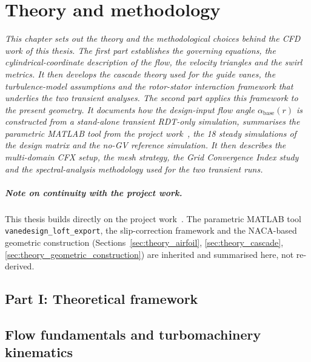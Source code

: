 \chapter{Theory and methodology}
\label{chap:theory_method}

\begin{center} %
\singlespacing\parbox{12cm}{\textit{
This chapter sets out the theory and the methodological choices behind the CFD work of this thesis. The first part establishes the governing equations, the cylindrical-coordinate description of the flow, the velocity triangles and the swirl metrics. It then develops the cascade theory used for the guide vanes, the turbulence-model assumptions and the rotor-stator interaction framework that underlies the two transient analyses. The second part applies this framework to the present geometry. It documents how the design-input flow angle $\alpha_{\mathrm{base}}(r)$ is constructed from a stand-alone transient RDT-only simulation, summarises the parametric MATLAB tool from the project work~\cite{Leonsen2025}, the 18 steady simulations of the design matrix and the no-GV reference simulation. It then describes the multi-domain CFX setup, the mesh strategy, the Grid Convergence Index study and the spectral-analysis methodology used for the two transient runs.
}}
\end{center}

\paragraph{Note on continuity with the project work.}
This thesis builds directly on the project work~\cite{Leonsen2025}. The parametric MATLAB tool \texttt{vanedesign\_loft\_export}, the slip-correction framework and the NACA-based geometric construction (Sections~\ref{sec:theory_airfoil}, \ref{sec:theory_cascade}, \ref{sec:theory_geometric_construction}) are inherited and summarised here, not re-derived.


\section*{Part I: Theoretical framework}
\section{Flow fundamentals and turbomachinery kinematics}
\label{sec:theory_kinematics}

